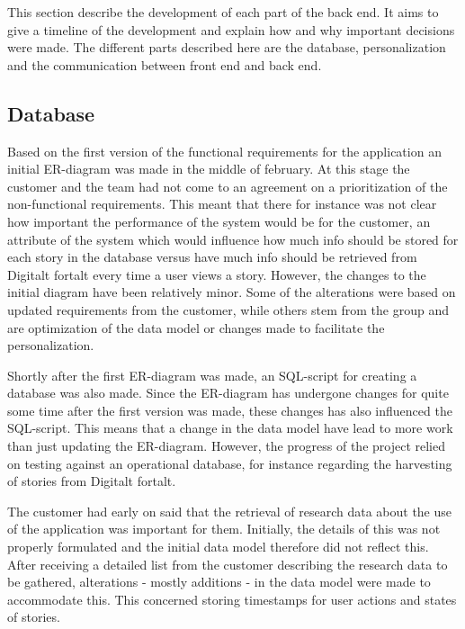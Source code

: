 This section describe the development of each part of the back end. It aims to give a timeline of the development and explain how and why important decisions were made. The different parts described here are the database, personalization and the communication between front end and back end. 

\subsection{Database}

Based on the first version of the functional requirements for the application an initial ER-diagram was made in the middle of february. At this stage the customer and the team had not come to an agreement on a prioritization of the non-functional requirements. This meant that there for instance was not clear how important the performance of the system would be for the customer, an attribute of the system which would influence how much info should be stored for each story in the database versus have much info should be retrieved from Digitalt fortalt every time a user views a story. However, the changes to the initial diagram have been relatively minor. Some of the alterations were based on updated requirements from the customer, while others stem from the group and are optimization of the data model or changes made to facilitate the personalization. \newline

Shortly after the first ER-diagram was made, an SQL-script for creating a database was also made. Since the ER-diagram has undergone changes for quite some time after the first version was made, these changes has also influenced the SQL-script. This means that a change in the data model have lead to more work than just updating the ER-diagram. However, the progress of the project relied on testing against an operational database, for instance regarding the harvesting of stories from Digitalt fortalt. \newline

The customer had early on said that the retrieval of research data about the use of the application was important for them. Initially, the details of this was not properly formulated and the initial data model therefore did not reflect this. After receiving a detailed list from the customer describing the research data to be gathered, alterations - mostly additions - in the data model were made to accommodate this. This concerned storing timestamps for user actions and states of stories.  \newline

